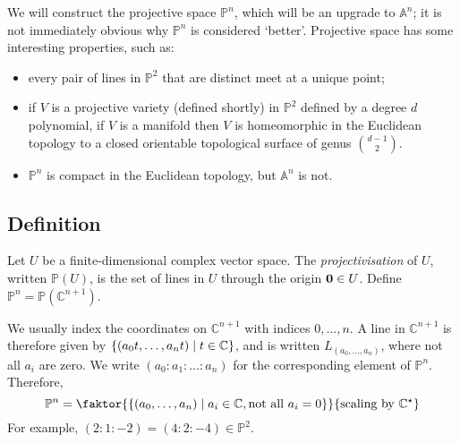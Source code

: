 We will construct the projective space \( \mathbb P^n \), which will be an upgrade to \( \mathbb A^n \); it is not immediately obvious why \( \mathbb P^n \) is considered `better'.
Projective space has some interesting properties, such as:
\begin{itemize}
    \item every pair of lines in \( \mathbb P^2 \) that are distinct meet at a unique point;
    \item if \( V \) is a projective variety (defined shortly) in \( \mathbb P^2 \) defined by a degree \( d \) polynomial, if \( V \) is a manifold then \( V \) is homeomorphic in the Euclidean topology to a closed orientable topological surface of genus \( \binom{d-1}{2} \).
    \item \( \mathbb P^n \) is compact in the Euclidean topology, but \( \mathbb A^n \) is not.
\end{itemize}

\subsection{Definition}
\begin{definition}
    Let \( U \) be a finite-dimensional complex vector space.
    The \emph{projectivisation} of \( U \), written \( \mathbb P(U) \), is the set of lines in \( U \) through the origin \( \vb 0 \in U \).
    Define \( \mathbb P^n = \mathbb P(\mathbb C^{n+1}) \).
\end{definition}
We usually index the coordinates on \( \mathbb C^{n+1} \) with indices \( 0, \dots, n \).
A line in \( \mathbb C^{n+1} \) is therefore given by \( \qty{(a_0 t, \dots, a_n t) \mid t \in \mathbb C} \), and is written \( L_{(a_0, \dots, a_n)} \), where not all \( a_i \) are zero.
We write \( (a_0 : a_1 : \dots : a_n) \) for the corresponding element of \( \mathbb P^n \).
Therefore,
\[ \mathbb P^n = \faktor{\qty{(a_0, \dots, a_n) \mid a_i \in \mathbb C, \text{not all } a_i = 0}}{\text{scaling by } \mathbb C^\star} \]
For example, \( (2 : 1 : -2) = (4 : 2 : -4) \in \mathbb P^2 \).

